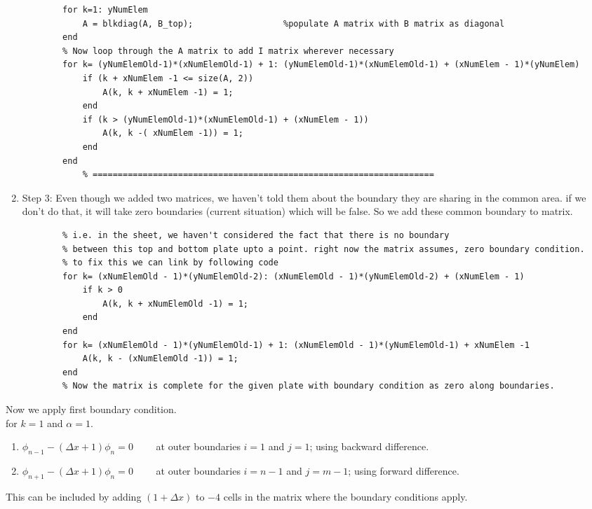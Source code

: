 \documentclass{article}
\begin{document}
\begin{enumerate}
\begin{lstlisting}
        for k=1: yNumElem
            A = blkdiag(A, B_top);                  %populate A matrix with B matrix as diagonal
        end
        % Now loop through the A matrix to add I matrix wherever necessary
        for k= (yNumElemOld-1)*(xNumElemOld-1) + 1: (yNumElemOld-1)*(xNumElemOld-1) + (xNumElem - 1)*(yNumElem)
            if (k + xNumElem -1 <= size(A, 2))   
                A(k, k + xNumElem -1) = 1;
            end
            if (k > (yNumElemOld-1)*(xNumElemOld-1) + (xNumElem - 1))
                A(k, k -( xNumElem -1)) = 1;
            end
        end
            % ====================================================================
    \end{lstlisting}
    \item Step 3: Even though we added two matrices, we haven't told them about the boundary they are sharing in the common area. if we don't do that, it will take zero boundaries (current situation) which will be false. So we add these common boundary to matrix.\\
    \begin{lstlisting}
        % i.e. in the sheet, we haven't considered the fact that there is no boundary 
        % between this top and bottom plate upto a point. right now the matrix assumes, zero boundary condition.
        % to fix this we can link by following code
        for k= (xNumElemOld - 1)*(yNumElemOld-2): (xNumElemOld - 1)*(yNumElemOld-2) + (xNumElem - 1)
            if k > 0
                A(k, k + xNumElemOld -1) = 1;
            end
        end
        for k= (xNumElemOld - 1)*(yNumElemOld-1) + 1: (xNumElemOld - 1)*(yNumElemOld-1) + xNumElem -1
            A(k, k - (xNumElemOld -1)) = 1;
        end
        % Now the matrix is complete for the given plate with boundary condition as zero along boundaries.
    \end{lstlisting}
\end{enumerate}
Now we apply first boundary condition.\\
for $k=1$ and $\alpha = 1$.
\begin{enumerate}
    \item $\phi_{n-1} - (\Delta x +1)\phi_{n} = 0 \qquad$ at outer boundaries $i=1$ and $j=1$; using backward difference.
    \item $\phi_{n+1} - (\Delta x +1)\phi_{n} = 0 \qquad$ at outer boundaries $i=n-1$ and $j=m-1$; using forward difference.
\end{enumerate}
This can be included by adding $(1 + \Delta x)$ to $-4$ cells in the matrix where the boundary conditions apply.\\
\end{document}
